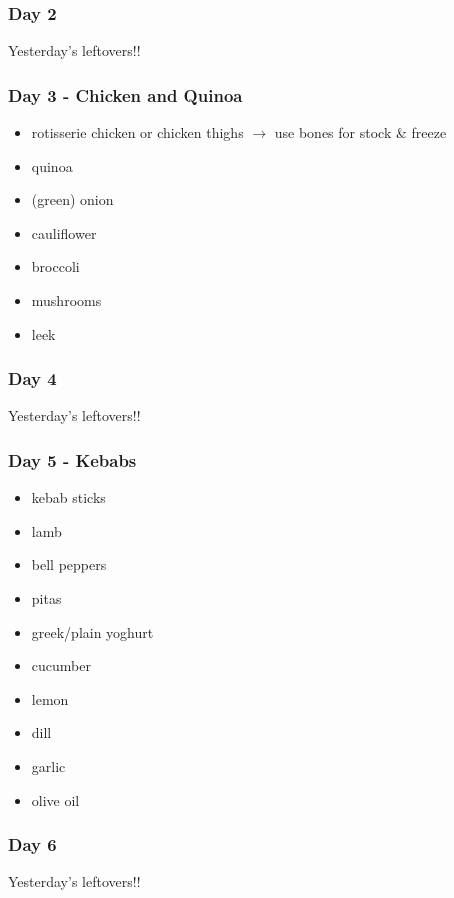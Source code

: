 \documentclass[11pt, a4paper]{article}
\begin{document}
\subsubsection{Day 2}
\vspace{1pc}
Yesterday's leftovers!!

\subsubsection{Day 3 - Chicken and Quinoa}
\vspace{1pc}
\begin{itemize}
\item rotisserie chicken or chicken thighs $\longrightarrow$ use bones for stock \& freeze
\item quinoa
\item (green) onion
\item cauliflower
\item broccoli
\item mushrooms
\item leek
\end{itemize}

\subsubsection{Day 4}
\vspace{1pc}
Yesterday's leftovers!!

\subsubsection{Day 5 - Kebabs}
\vspace{1pc}
\begin{itemize}
\item kebab sticks
\item lamb
\item bell peppers
\item pitas
\item greek/plain yoghurt 
\item cucumber
\item lemon
\item dill
\item garlic
\item olive oil
\end{itemize}

\subsubsection{Day 6}
\vspace{1pc}
Yesterday's leftovers!!
\end{document}
